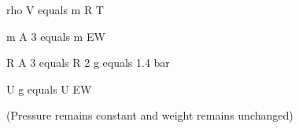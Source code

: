 rho V equals m R T  

m A 3 equals m EW  

R A 3 equals R 2 g equals 1.4 bar  

U g equals U EW  

(Pressure remains constant and weight remains unchanged)
